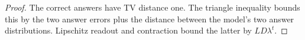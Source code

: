 \begin{proof}
The correct answers have TV distance one. The triangle inequality bounds this
by the two answer errors plus the distance between the model's two answer
distributions. Lipschitz readout and contraction bound the latter by
$LD\lambda^t$.
\end{proof}
